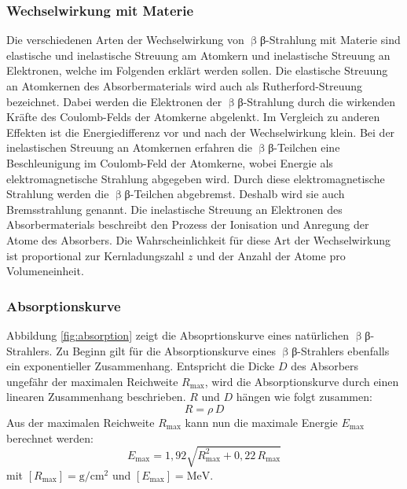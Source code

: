 \subsubsection{Wechselwirkung mit Materie}
Die verschiedenen Arten der Wechselwirkung von $\upbeta${β}-Strahlung mit Materie sind elastische und inelastische Streuung am Atomkern und inelastische Streuung an Elektronen, welche im Folgenden erklärt werden sollen.
Die elastische Streuung an Atomkernen des Absorbermaterials wird auch als Rutherford-Streuung bezeichnet. Dabei werden die Elektronen der $\upbeta${β}-Strahlung durch die wirkenden Kräfte des Coulomb-Felds der Atomkerne abgelenkt. Im Vergleich zu anderen Effekten ist die Energiedifferenz vor und nach der Wechselwirkung klein.
Bei der inelastischen Streuung an Atomkernen erfahren die $\upbeta${β}-Teilchen eine Beschleunigung im Coulomb-Feld der Atomkerne, wobei Energie als elektromagnetische Strahlung abgegeben wird. Durch diese elektromagnetische Strahlung werden die $\upbeta${β}-Teilchen abgebremst. Deshalb wird sie auch Bremsstrahlung genannt.
Die inelastische Streuung an Elektronen des Absorbermaterials beschreibt den Prozess der Ionisation und Anregung der Atome des Absorbers. Die Wahrscheinlichkeit für diese Art der Wechselwirkung ist proportional zur Kernladungszahl $z$ und der Anzahl der Atome pro Volumeneinheit.

\subsubsection{Absorptionskurve}
Abbildung \ref{fig:absorption} zeigt die Absoprtionskurve eines natürlichen $\upbeta${β}-Strahlers. Zu Beginn gilt für die Absorptionskurve eines $\upbeta${β}-Strahlers ebenfalls ein exponentieller Zusammenhang. Entspricht die Dicke $D$ des Absorbers ungefähr der maximalen Reichweite $R_\mathrm{max}$, wird die Absorptionskurve durch einen linearen Zusammenhang beschrieben. $R$ und $D$ hängen wie folgt zusammen:
\begin{equation}
  R=\rho\,D
\end{equation}
Aus der maximalen Reichweite $R_\mathrm{max}$ kann nun die maximale Energie $E_\mathrm{max}$ berechnet werden:
\begin{equation}
  \label{eqn:E_max}
  E_\mathrm{max} = 1,92 \sqrt{R_\mathrm{max}^2+0,22\,R_\mathrm{max}}
\end{equation}
mit $[R_\mathrm{max}]=\si{\gram\per\centi\meter\squared}$ und $[E_\mathrm{max}]= \si{\mega\electronvolt}$.
